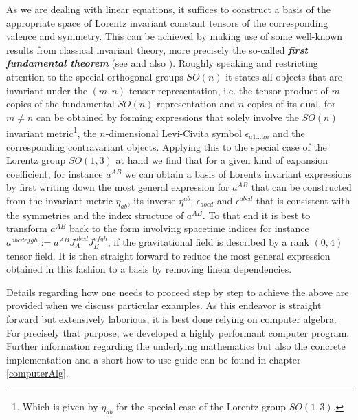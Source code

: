 \documentclass[a4paper,12pt, DIV=14, BCOR=5mm, twoside, headsepline, numbers=noenddot]{scrbook}
\begin{document}
As we are dealing with linear equations, it suffices to construct a basis of the appropriate space of Lorentz invariant constant tensors of the corresponding valence and symmetry. This can be achieved by making use of some well-known results from classical invariant theory, more precisely the so-called \textit{\textbf{first fundamental theorem}} (see \cite{Aslaksen1995InvariantTO} and also \cite{PROCESI1976306}). Roughly speaking and restricting attention to the special orthogonal groups $SO(n)$ it states all objects that are invariant under the $(m,n)$ tensor representation, i.e. the tensor product of $m$ copies of the fundamental $SO(n)$ representation and $n$ copies of its dual, for $m \neq n$ can be obtained by forming expressions that solely involve the $SO(n)$ invariant metric\footnote{Which is given by $\eta_{ab}$ for the special case of the Lorentz group $SO(1,3)$.}, the $n$-dimensional Levi-Civita symbol $\epsilon_{a1...an}$ and the corresponding contravariant objects. Applying this to the special case of the Lorentz group $SO(1,3)$ at hand we find that for a given kind of expansion coefficient, for instance $a^{AB}$ we can obtain a basis of Lorentz invariant expressions by first writing down the most general expression for $a^{AB}$ that can be constructed from the invariant metric $\eta_{ab}$, its inverse $\eta^{ab}$, $\epsilon_{abcd}$ and $\epsilon^{abcd}$ that is consistent with the symmetries and the index structure of $a^{AB}$. To that end it is best to transform $a^{AB}$ back to the form involving spacetime indices for instance $a^{abcdefgh} := a^{AB}J_A^{abcd}J_B^{efgh}$, if the gravitational field is described by a rank $(0,4)$ tensor field. It is then straight forward to reduce the most general expression obtained in this fashion to a basis by removing linear dependencies.

Details regarding how one needs to proceed step by step to achieve the above are provided when we discuss particular examples. As this endeavor is straight forward but extensively laborious, it is best done relying on computer algebra. For precisely that purpose, we developed a highly performant computer program. 
Further information regarding the underlying mathematics but also the concrete implementation and a short how-to-use guide can be found in chapter \ref{computerAlg}. 
\end{document}
